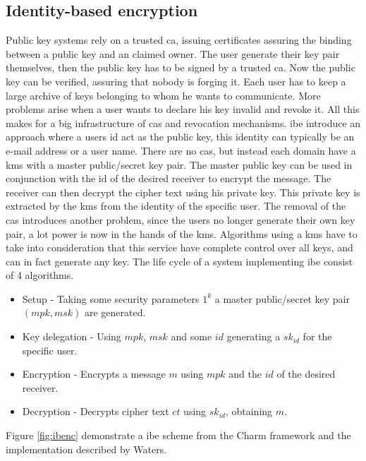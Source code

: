 \subsection{Identity-based encryption}\label{subsec:IBE}
Public key systems rely on a trusted \gls{ca}, issuing certificates assuring the binding between a public key and an claimed owner. The user generate their key pair themselves, then the public key has to be signed by a trusted \glsdesc{ca}. Now the public key can be verified, assuring that nobody is forging it. Each user has to keep a large archive of keys belonging to whom he wants to communicate. More problems arise when a user wants to declare his key invalid and revoke it. All this makes for a big infrastructure of \glspl{ca} and revocation mechanisms. \Gls{ibe}\cite{DBLP:ibe} introduce an approach where a users id act as the public key, this identity can typically be an e-mail address or a user name. There are no \glspl{ca}, but instead each domain have a \gls{kms} with a master public/secret key pair. The master public key can be used in conjunction with the id of the desired receiver to encrypt the message. The receiver can then decrypt the cipher text using his private key. This private key is extracted by the \gls{kms} from the identity of the specific user. The removal of the \glspl{ca} introduces another problem, since the users no longer generate their own key pair, a lot power is now in the hands of the \gls{kms}. Algorithms using a \gls{kms} have to take into consideration that this service have complete control over all keys, and can in fact generate any key. The life cycle of a system implementing \gls{ibe} consist of 4 algorithms. 

\begin{itemize}
\item Setup - Taking some security parameters $1^k$ a master public/secret key pair $(mpk, msk)$ are generated.
\item Key delegation - Using $mpk$, $msk$ and some $id$ generating a $sk_{id}$ for the specific user. 
\item Encryption - Encrypts a message $m$ using $mpk$ and the $id$ of the desired receiver. 
\item Decryption - Decrypts cipher text $ct$ using $sk_{id}$, obtaining $m$. 
\end{itemize}
\newpage
Figure \ref{fig:ibenc} demonstrate a \gls{ibe} scheme from the Charm framework and the implementation described by Waters\cite{ibe_waters09}.

